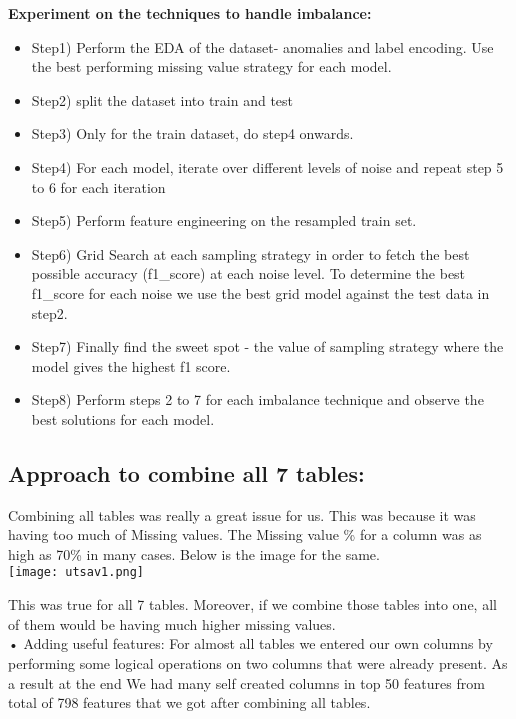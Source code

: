\documentclass[fleqn,10pt]{SelfArx} %
\begin{document}
\begin{itemize}
\begin{itemize}
\end{itemize}

\textbf{Experiment on the techniques to handle imbalance:}
\begin{itemize}
	\item Step1) Perform the EDA of the dataset- anomalies and label encoding. Use the best performing missing value strategy for each model.
	\item Step2) split the dataset into train and test
	\item 	Step3) Only for the train dataset, do step4 onwards.
	\item Step4) For each model, iterate over different levels of noise and repeat step 5 to 6 for each iteration
	\item 	Step5) Perform feature engineering on the resampled train set.
	\item Step6) Grid Search at each sampling strategy in order to fetch the best possible accuracy (f1_score) at each noise level. To determine the best f1_score for each noise we use the best grid model against the test data in step2.
	\item Step7) Finally find the sweet spot - the value of sampling strategy where the model gives the highest f1 score.
	\item 	Step8) Perform steps 2 to 7 for each imbalance technique and observe the best solutions for each model.
	
\end{itemize}


\subsection{Approach to combine all 7 tables:}
Combining all tables was really a great issue for us. This was because it was having too much of Missing values. The Missing value \% for a column was as high as 70\% in many cases. Below is the image for the same.\\
\texttt{[image: utsav1.png]}
\label{fig:results}

\noindent
This was true for all 7 tables. Moreover, if we combine those tables into one, all of them  would be having much higher missing values.\\

\noindent
•	Adding useful features: For almost all tables we entered our own columns by performing some logical operations on two columns that were already present. As a result at the end We had many self created columns in top 50 features from total of 798 features that we got after combining all tables. \\


\end{itemize}
\end{document}
